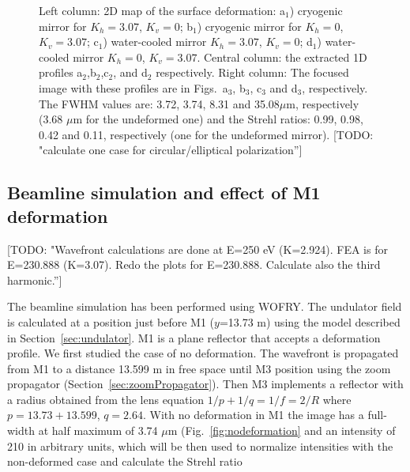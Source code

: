 \documentclass[]{spie}  %
\newcommand{\todo}[1]{{\color{red}[TODO: "#1'']}}
\begin{document}
\begin{figure} [ht]
\begin{center}
\begin{tabular}{l}
   \end{tabular}
  \end{center}
   \caption[example] 
   { \label{fig:M1deformation} 
   Left column: 2D map of the surface deformation: a$_1$) cryogenic mirror for $K_h=3.07$, $K_v=0$; b$_1$) cryogenic mirror for $K_h=0$, $K_v=3.07$; c$_1$) water-cooled mirror $K_h=3.07$, $K_v=0$; d$_1$) water-cooled mirror $K_h=0$, $K_v=3.07$. Central column: the extracted 1D profiles a$_2$,b$_2$,c$_2$, and d$_2$ respectively. Right column: The focused image with these profiles are in Figs.~a$_3$, b$_3$, c$_3$ and d$_3$, respectively. 
   The FWHM values are: 3.72, 3.74, 8.31 and 35.08$\mu$m, respectively (3.68 $\mu$m for the undeformed one) and the Strehl ratios: 0.99, 0.98, 0.42 and 0.11, respectively (one for the undeformed mirror).
   \todo{calculate one case for circular/elliptical polarization}
   }
   \end{figure} 


\subsection{Beamline simulation and effect of M1 deformation}

\todo{Wavefront calculations are done at E=250 eV (K=2.924). FEA is for E=230.888 (K=3.07). Redo the plots for E=230.888. Calculate also the third harmonic.} 

The beamline simulation has been performed using WOFRY. The undulator field is calculated at a position just before M1 ($y$=13.73 m) using the model described in Section~\ref{sec:undulator}. M1 is a plane reflector that accepts a deformation profile. We first studied the case of no deformation. The wavefront is propagated from M1 to a distance 13.599 m in free space until M3 position using the zoom propagator (Section~\ref{sec:zoomPropagator}). Then M3 implements a reflector with a radius obtained from the lens equation $1/p + 1/q=1/f=2/R$ where $p=13.73+13.599$, $q=2.64$. With no deformation in M1 the image has a full-width at half maximum of 3.74 $\mu$m (Fig.~\ref{fig:nodeformation} and an intensity of 210 in arbitrary units, which will be then used to normalize intensities with the non-deformed case and calculate the Strehl ratio
\end{document}
